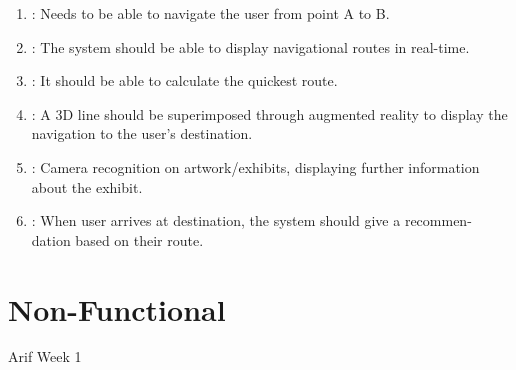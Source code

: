 
\begin{enumerate}
	\item \textbf{}: Needs to be able to navigate the user from point A to B.
	\item \textbf{}: The system should be able to display navigational routes in real-time.
	\item \textbf{}: It should be able to calculate the quickest route.
	\item \textbf{}: A 3D line should be superimposed through augmented reality to display the navigation to the user’s destination.
	\item \textbf{}: Camera recognition on artwork/exhibits, displaying further information about the exhibit.
	\item \textbf{}: When user arrives at destination, the system should give a recommen- dation based on their route.
\end{enumerate}



\section{Non-Functional}
Arif Week 1

